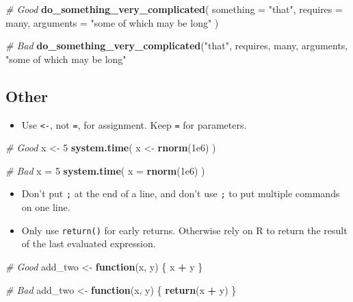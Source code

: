 \documentclass[]{book}
\newenvironment{Shaded}{\begin{snugshade}}{\end{snugshade}}
\newcommand{\CommentTok}[1]{\textcolor[rgb]{0.56,0.35,0.01}{\textit{#1}}}
\newcommand{\ControlFlowTok}[1]{\textcolor[rgb]{0.13,0.29,0.53}{\textbf{#1}}}
\newcommand{\DataTypeTok}[1]{\textcolor[rgb]{0.13,0.29,0.53}{#1}}
\newcommand{\DecValTok}[1]{\textcolor[rgb]{0.00,0.00,0.81}{#1}}
\newcommand{\FloatTok}[1]{\textcolor[rgb]{0.00,0.00,0.81}{#1}}
\newcommand{\KeywordTok}[1]{\textcolor[rgb]{0.13,0.29,0.53}{\textbf{#1}}}
\newcommand{\NormalTok}[1]{#1}
\newcommand{\OperatorTok}[1]{\textcolor[rgb]{0.81,0.36,0.00}{\textbf{#1}}}
\newcommand{\StringTok}[1]{\textcolor[rgb]{0.31,0.60,0.02}{#1}}
\providecommand{\tightlist}{%
  \setlength{\itemsep}{0pt}\setlength{\parskip}{0pt}}
\theoremstyle{definition}
\theoremstyle{definition}
\theoremstyle{definition}
\theoremstyle{remark}
\begin{document}
\begin{Shaded}
\begin{Highlighting}[]
\CommentTok{# Good}
\KeywordTok{do_something_very_complicated}\NormalTok{(}
  \DataTypeTok{something =} \StringTok{"that"}\NormalTok{,}
  \DataTypeTok{requires  =}\NormalTok{ many,}
  \DataTypeTok{arguments =} \StringTok{"some of which may be long"}
\NormalTok{)}

\CommentTok{# Bad}
\KeywordTok{do_something_very_complicated}\NormalTok{(}\StringTok{"that"}\NormalTok{, requires, many, arguments,}
                              \StringTok{"some of which may be long"}
\end{Highlighting}
\end{Shaded}

\hypertarget{other}{%
\subsection{Other}\label{other}}

\begin{itemize}
\tightlist
\item
  Use \texttt{\textless{}-}, not \texttt{=}, for assignment. Keep
  \texttt{=} for parameters.
\end{itemize}

\begin{Shaded}
\begin{Highlighting}[]
\CommentTok{# Good}
\NormalTok{x <-}\StringTok{ }\DecValTok{5}
\KeywordTok{system.time}\NormalTok{(}
\NormalTok{  x <-}\StringTok{ }\KeywordTok{rnorm}\NormalTok{(}\FloatTok{1e6}\NormalTok{)}
\NormalTok{)}

\CommentTok{# Bad}
\NormalTok{x =}\StringTok{ }\DecValTok{5}
\KeywordTok{system.time}\NormalTok{(}
  \DataTypeTok{x =} \KeywordTok{rnorm}\NormalTok{(}\FloatTok{1e6}\NormalTok{)}
\NormalTok{)}
\end{Highlighting}
\end{Shaded}

\begin{itemize}
\item
  Don't put \texttt{;} at the end of a line, and don't use \texttt{;} to
  put multiple commands on one line.
\item
  Only use \texttt{return()} for early returns. Otherwise rely on R to
  return the result of the last evaluated expression.
\end{itemize}

\begin{Shaded}
\begin{Highlighting}[]
\CommentTok{# Good}
\NormalTok{add_two <-}\StringTok{ }\ControlFlowTok{function}\NormalTok{(x, y) \{}
\NormalTok{  x }\OperatorTok{+}\StringTok{ }\NormalTok{y}
\NormalTok{\}}

\CommentTok{# Bad}
\NormalTok{add_two <-}\StringTok{ }\ControlFlowTok{function}\NormalTok{(x, y) \{}
  \KeywordTok{return}\NormalTok{(x }\OperatorTok{+}\StringTok{ }\NormalTok{y)}
\NormalTok{\}}
\end{Highlighting}
\end{Shaded}
\end{document}

